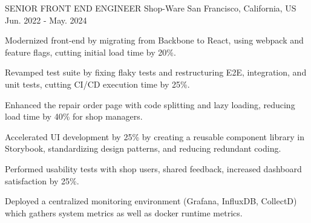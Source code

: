 

\begin{cventries}

    \cventry
    {SENIOR FRONT END ENGINEER} %
    {Shop-Ware} %
    {San Francisco, California, US} %
    {Jun. 2022 - May. 2024} %
    {
        \begin{cvitems} %
            \item {Modernized front-end by migrating from Backbone to React, using webpack and feature flags, cutting initial load time by 20\%.}
            \item {Revamped test suite by fixing flaky tests and restructuring E2E, integration, and unit tests, cutting CI/CD execution time by 25\%.}
            \item {Enhanced the repair order page with code splitting and lazy loading, reducing load time by 40\% for shop managers.}
            \item {Accelerated UI development by 25\% by creating a reusable component library in Storybook, standardizing design patterns, and reducing redundant coding.}
            \item {Performed usability tests with shop users, shared feedback, increased dashboard satisfaction by 25\%.}
            \item {Deployed a centralized monitoring environment (Grafana, InfluxDB, CollectD) which gathers system metrics as well as docker runtime metrics.}
        \end{cvitems}
    }


\end{cventries}
